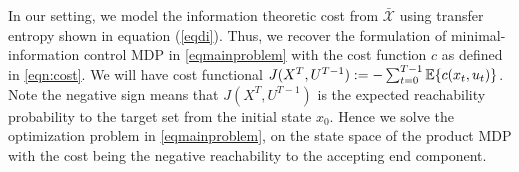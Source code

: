 





In our setting, we model the information theoretic cost from $\mathcal{\bar{X}}$ using transfer entropy shown in equation (\ref{eqdi}). Thus, we recover the formulation of minimal-information control MDP in \eqref{eqmainproblem} with the cost function $c$ as defined in \eqref{eqn:cost}. We will have cost functional $J(X^T,U^{T-1}) := - \sum_{t=0}^{T-1}{\mathbb{E}\{c(x_t,u_t)\}}$. Note the negative sign means that $J(X^T,U^{T-1})$ is the expected reachability probability to the target set from the initial state $x_0$. Hence we solve the optimization problem in \eqref{eqmainproblem}, on the state space of the product MDP with the cost being the negative reachability to the accepting end component. 

